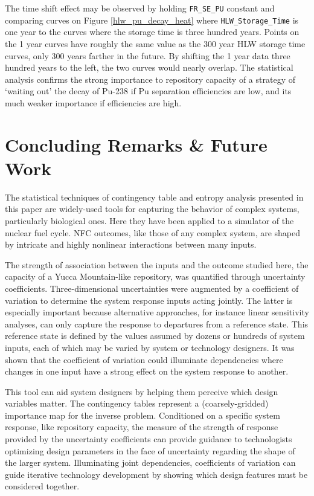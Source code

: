 \documentclass[preprint,12pt]{elsarticle}
\begin{document}
The time shift effect may be observed by holding \texttt{FR\_SE\_PU} constant and comparing curves on Figure \ref{hlw_pu_decay_heat}
where \texttt{HLW\_Storage\_Time} is one year to the curves where the storage time is three hundred years.  Points on the 1 year curves have
roughly the same value as the 300 year HLW storage time curves, only 300 years farther in the future.  By shifting the 1 year data
three hundred years to the left, the two curves would nearly overlap.  The statistical analysis confirms the strong importance to repository capacity of a strategy of `waiting out' the decay of Pu-238 if Pu separation efficiencies are low, and its much weaker importance if efficiencies are high.

\section{Concluding Remarks \& Future Work}
\label{sec:conclusion}

The statistical techniques of contingency table and entropy analysis presented in this paper are widely-used tools for capturing the behavior of complex systems, particularly biological ones.  Here they have been applied to a simulator of the nuclear fuel cycle.  NFC outcomes, like those of any complex system, are shaped by intricate and highly nonlinear interactions between many inputs.

The strength of association between the inputs and the outcome studied here, the capacity of a Yucca Mountain-like repository, was quantified through uncertainty coefficients.  Three-dimensional uncertainties were augmented by a coefficient of variation to determine the system response inputs acting jointly.  The latter is especially important because alternative approaches, for instance linear sensitivity analyses, can only capture the response to departures from a reference state.  This reference state is defined by the values assumed by dozens or hundreds of system inputs, each of which may be varied by system or technology designers.  It was shown that the coefficient of variation could illuminate dependencies where changes in one input have a strong effect on the system response to another.  

This tool can aid system designers by helping them perceive which design variables matter.  The contingency tables represent a (coarsely-gridded) importance map for the inverse problem.  Conditioned on a specific system response, like repository capacity, the measure of the strength of response provided by the uncertainty coefficients can provide guidance to technologists optimizing design parameters in the face of uncertainty regarding the shape of the larger system.  Illuminating joint dependencies, coefficients of variation can guide iterative technology development by showing which design features must be considered together.
\end{document}
